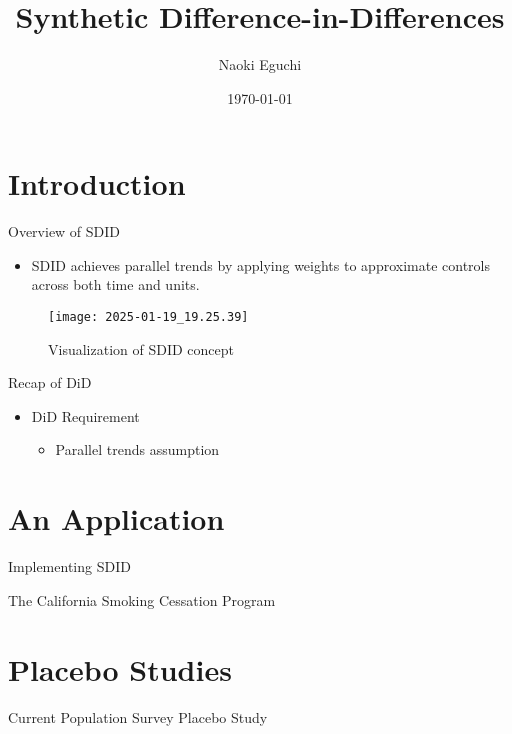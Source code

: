 \documentclass[xcolor=svgnames,aspectratio=169]{beamer}
\begin{document}
\title{Synthetic Difference-in-Differences}
\author{Naoki Eguchi}          
\date{\today}

\begin{frame}
    \titlepage                     
\end{frame}

\section{Introduction}

\begin{frame}{Overview of SDID}
\begin{itemize}
    \item SDID achieves parallel trends by applying weights to approximate controls across both time and units.
\end{itemize}
\begin{figure}
    \texttt{[image: 2025-01-19\_19.25.39]}
    \caption{Visualization of SDID concept}
\end{figure}
\end{frame}

\begin{frame}{Recap of DiD}
\begin{itemize}
    \item DiD Requirement
    \begin{itemize}
        \item Parallel trends assumption
    \end{itemize}
\end{itemize}
\end{frame}

\section{An Application}
\begin{frame}{Implementing SDID}
\end{frame}

\begin{frame}{The California Smoking Cessation Program}
\end{frame}

\section{Placebo Studies}
\begin{frame}{Current Population Survey Placebo Study}
\end{frame}
\end{document}
